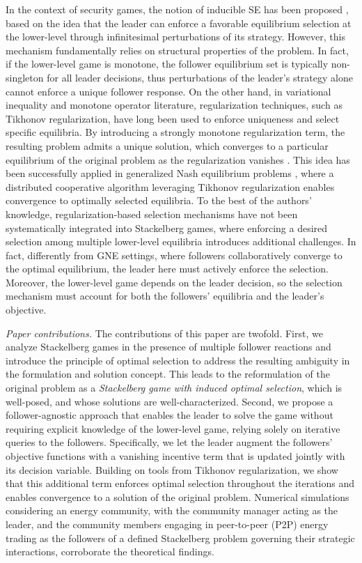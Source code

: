 \documentclass[letterpaper, 10 pt, conference]{ieeeconf}
\begin{document}
In the context of security games, the notion of inducible SE has been proposed \cite{guo2019inducibility}, based on the idea that the leader can enforce a favorable equilibrium selection at the lower-level through infinitesimal perturbations of its strategy. However, this mechanism fundamentally relies on structural properties of the problem. In fact, if the lower-level game is monotone, the follower equilibrium set is typically non-singleton for all leader decisions, thus perturbations of the leader’s strategy alone cannot enforce a unique follower response.
On the other hand, in variational inequality and monotone operator literature, regularization techniques, such as Tikhonov regularization, have long been used to enforce uniqueness and select specific equilibria. By introducing a strongly monotone regularization term, the resulting problem admits a unique solution, which converges to a particular equilibrium of the original problem as the regularization vanishes  \cite{yamada2005hybrid, xu2003convergence, cegielski2014properties}. This idea has been successfully applied in generalized Nash equilibrium problems \cite{benenati2023semi, benenatix2023optimal}, where a distributed cooperative algorithm leveraging Tikhonov regularization enables convergence to optimally selected equilibria. To the best of the authors' knowledge, regularization-based selection mechanisms have not been systematically integrated into Stackelberg games, where enforcing a desired selection among multiple lower-level equilibria introduces additional challenges. In fact, differently from GNE settings, where followers collaboratively converge to the optimal equilibrium, the leader here must actively enforce the selection. Moreover, the lower-level game depends on the leader decision, so the selection mechanism must account for both the followers’ equilibria and the leader’s objective.

\smallskip
\noindent
\emph{Paper contributions.}
The contributions of this paper are twofold. First, we analyze Stackelberg games in the presence of multiple follower reactions and introduce the principle of optimal selection to address the resulting ambiguity in the formulation and solution concept. This leads to the reformulation of the original problem as a \emph{Stackelberg game with induced optimal selection}, which is well-posed, and whose solutions are well-characterized. Second, we propose a follower-agnostic approach that enables the leader to solve the game without requiring explicit knowledge of the lower-level game, relying solely on iterative queries to the followers. Specifically, we let the leader augment the followers’ objective functions with a vanishing incentive term that is updated jointly with its decision variable. Building on tools from Tikhonov regularization, we show that this additional term enforces optimal selection throughout the iterations and enables convergence to a solution of the original problem. Numerical simulations considering an energy community, with the community manager acting as the leader, and the community members engaging in peer-to-peer (P2P) energy trading as the followers of a defined Stackelberg problem governing their strategic interactions, corroborate the theoretical findings.
\end{document}
